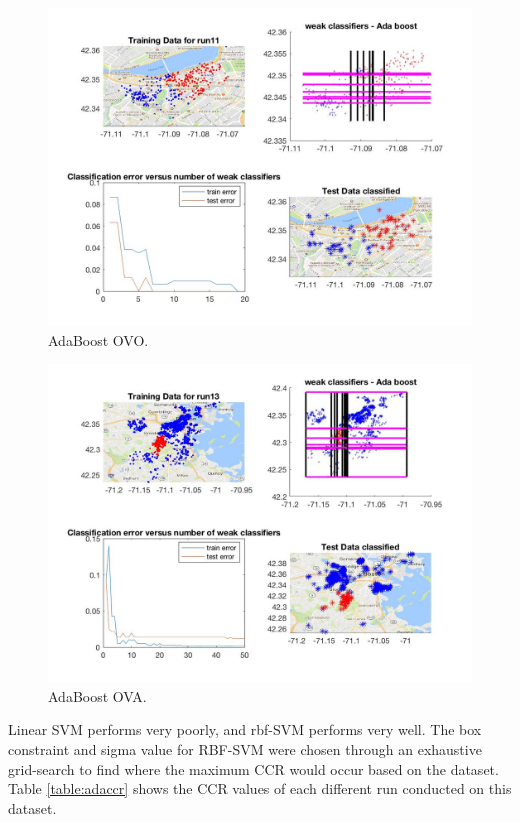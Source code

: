 \documentclass[10pt,twocolumn,letterpaper]{article}
\begin{document}
\begin{figure}[h!]
  \includegraphics[width=\linewidth]{ada_fig2.jpg}
  \caption{AdaBoost OVO.}
  \label{fig:ada2}
\end{figure}

\begin{figure}[h!]
  \includegraphics[width=\linewidth]{ada_fig3.jpg}
  \caption{AdaBoost OVA.}
  \label{fig:ada3}
\end{figure}

\indent Linear SVM performs very poorly, and rbf-SVM performs very well.  The box constraint and sigma value for RBF-SVM were chosen through an exhaustive grid-search to find where the maximum CCR would occur based on the dataset. Table \ref{table:adaccr} shows the CCR values of each different run conducted on this dataset. \\
\end{document}

